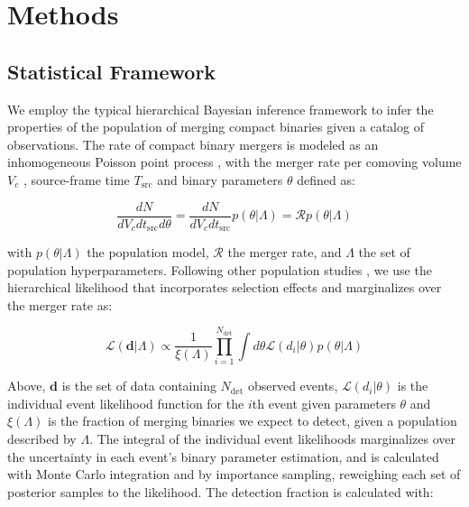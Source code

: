 \section{Methods} \label{sec:methods}

\subsection{Statistical Framework} \label{sec:statistical_framework}

We employ the typical hierarchical Bayesian inference framework to infer the properties of the population of merging compact binaries given a catalog of observations. The rate of compact binary mergers is modeled as an inhomogeneous Poisson point process \citep{10.1093/mnras/stz896}, with the merger rate per comoving volume $V_c$ \citep{astro-ph/9905116}, source-frame time $T_\text{src}$ and binary parameters $\theta$ defined as:

\begin{equation} \label{eq:rate}
    \frac{dN}{dV_cdt_\mathrm{src}d\theta} = \frac{dN}{dV_cdt_\mathrm{src}} p(\theta | \Lambda) = \mathcal{R} p(\theta | \Lambda)
\end{equation}

\noindent with $p(\theta | \Lambda)$ the population model, $\mathcal{R}$ the merger rate, and $\Lambda$ the set of population hyperparameters. Following other population studies \citep{10.1093/mnras/stz896,2021ApJ...913L...7A,2111.03634,2007.05579}, we use the hierarchical likelihood \citep{10.1063/1.1835214} that incorporates selection effects and marginalizes over the merger rate as: 

\begin{equation} \label{eq:likelihood}
    \mathcal{L}(\bm{d} | \Lambda) \propto \frac{1}{\xi(\Lambda)} \prod_{i=1}^{N_\mathrm{det}} \int d\theta \mathcal{L}(d_i | \theta) p(\theta | \Lambda)
\end{equation}

\noindent Above, $\bm{d}$ is the set of data containing $N_\mathrm{det}$ observed events, $\mathcal{L}(d_i | \theta)$ is the individual event likelihood function for the $i$th event given parameters $\theta$ and $\xi(\Lambda)$ is the fraction of merging binaries we expect to detect, given a population described by $\Lambda$. The integral of the individual event likelihoods marginalizes over the uncertainty in each event's binary parameter estimation, and is calculated with Monte Carlo integration and by importance sampling, reweighing each set of posterior samples to the likelihood. The detection fraction is calculated with:

